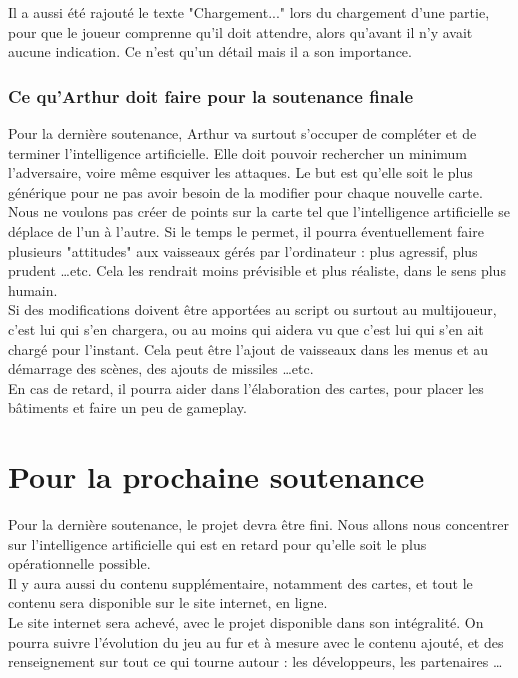 \documentclass[10pt, titlepage]{report}
\begin{document}
Il a aussi été rajouté le texte "Chargement..." lors du chargement d'une partie, pour que le joueur comprenne qu'il doit attendre, alors qu'avant il n'y avait aucune indication. Ce n'est qu'un détail mais il a son importance.\\

\subsection{Ce qu'Arthur doit faire pour la soutenance finale}
Pour la dernière soutenance, Arthur va surtout s'occuper de compléter et de terminer l'intelligence artificielle. Elle doit pouvoir rechercher un minimum l'adversaire, voire même esquiver les attaques. Le but est qu'elle soit le plus générique pour ne pas avoir besoin de la modifier pour chaque nouvelle carte. Nous ne voulons pas créer de points sur la carte tel que l'intelligence artificielle se déplace de l'un à l'autre. Si le temps le permet, il pourra éventuellement faire plusieurs "attitudes" aux vaisseaux gérés par l'ordinateur : plus agressif, plus prudent \dots  etc. Cela les rendrait moins prévisible et plus réaliste, dans le sens plus humain.\\

Si des modifications doivent être apportées au script ou surtout au multijoueur, c'est lui qui s'en chargera, ou au moins qui aidera vu que c'est lui qui s'en ait chargé pour l'instant. Cela peut être l'ajout de vaisseaux dans les menus et au démarrage des scènes, des ajouts de missiles \dots etc.\\

En cas de retard, il pourra aider dans l'élaboration des cartes, pour placer les bâtiments et faire un peu de gameplay.

\chapter{Pour la prochaine soutenance}
Pour la dernière soutenance, le projet devra être fini. Nous allons nous concentrer sur l'intelligence artificielle qui est en retard pour qu'elle soit le plus opérationnelle possible.\\

Il y aura aussi du contenu supplémentaire, notamment des cartes, et tout le contenu sera disponible sur le site internet, en ligne.\\

Le site internet sera achevé, avec le projet disponible dans son intégralité. On pourra suivre l'évolution du jeu au fur et à mesure avec le contenu ajouté, et des renseignement sur tout ce qui tourne autour : les développeurs, les partenaires \dots \\
\end{document}

